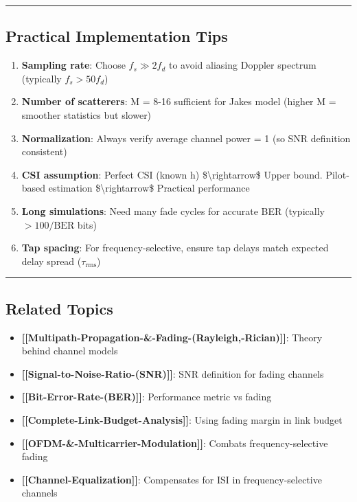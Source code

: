 \begin{center}\rule{0.5\linewidth}{0.5pt}\end{center}

\subsection{Practical Implementation
Tips}\label{practical-implementation-tips}

\begin{enumerate}
\def\labelenumi{\arabic{enumi}.}
\item
  \textbf{Sampling rate}: Choose \(f_s \gg 2f_d\) to avoid aliasing
  Doppler spectrum (typically \(f_s > 50 f_d\))
\item
  \textbf{Number of scatterers}: M = 8-16 sufficient for
  Jakes\textquotesingle{} model (higher M = smoother statistics but
  slower)
\item
  \textbf{Normalization}: Always verify average channel power = 1 (so
  SNR definition consistent)
\item
  \textbf{CSI assumption}: Perfect CSI (known h)
  \$\textbackslash rightarrow\$ Upper bound. Pilot-based estimation
  \$\textbackslash rightarrow\$ Practical performance
\item
  \textbf{Long simulations}: Need many fade cycles for accurate BER
  (typically \(> 100/\text{BER}\) bits)
\item
  \textbf{Tap spacing}: For frequency-selective, ensure tap delays match
  expected delay spread (\(\tau_{\text{rms}}\))
\end{enumerate}

\begin{center}\rule{0.5\linewidth}{0.5pt}\end{center}

\subsection{Related Topics}\label{related-topics}

\begin{itemize}
\tightlist
\item
  \textbf{{[}{[}Multipath-Propagation-\&-Fading-(Rayleigh,-Rician){]}{]}}:
  Theory behind channel models
\item
  \textbf{{[}{[}Signal-to-Noise-Ratio-(SNR){]}{]}}: SNR definition for
  fading channels
\item
  \textbf{{[}{[}Bit-Error-Rate-(BER){]}{]}}: Performance metric vs
  fading
\item
  \textbf{{[}{[}Complete-Link-Budget-Analysis{]}{]}}: Using fading
  margin in link budget
\item
  \textbf{{[}{[}OFDM-\&-Multicarrier-Modulation{]}{]}}: Combats
  frequency-selective fading
\item
  \textbf{{[}{[}Channel-Equalization{]}{]}}: Compensates for ISI in
  frequency-selective channels
\end{itemize}


